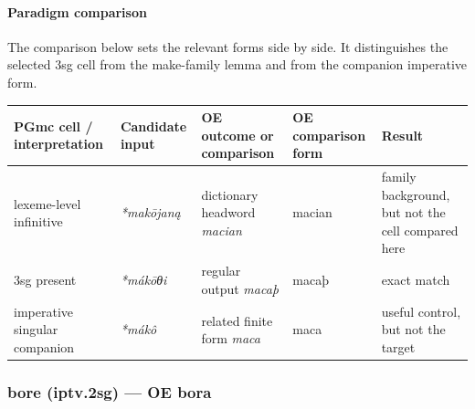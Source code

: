 \documentclass[
  british,
  a4paper,
]{article}
\newcounter{none} %
\begin{document}
\paragraph{Paradigm comparison}\label{paradigm-comparison-19}

The comparison below sets the relevant forms side by side. It
distinguishes the selected 3sg cell from the make-family lemma and from
the companion imperative form.

{\def\LTcaptype{none} %
\begin{longtable}[]{@{}
  >{\raggedright\arraybackslash}p{}
  >{\raggedright\arraybackslash}p{}
  >{\raggedright\arraybackslash}p{}
  >{\raggedright\arraybackslash}p{}
  >{\raggedright\arraybackslash}p{}@{}}
\toprule\noalign{}
\begin{minipage}[b]{\linewidth}\raggedright
PGmc cell / interpretation
\end{minipage} & \begin{minipage}[b]{\linewidth}\raggedright
Candidate input
\end{minipage} & \begin{minipage}[b]{\linewidth}\raggedright
OE outcome or comparison
\end{minipage} & \begin{minipage}[b]{\linewidth}\raggedright
OE comparison form
\end{minipage} & \begin{minipage}[b]{\linewidth}\raggedright
Result
\end{minipage} \\
\midrule\noalign{}
\endhead
\bottomrule\noalign{}
\endlastfoot
lexeme-level infinitive & \emph{*makōjaną} & dictionary headword
\emph{macian} & macian & family background, but not the cell compared
here \\
3sg present & \emph{*mákōθi} & regular output \emph{macaþ} & macaþ &
exact match \\
imperative singular companion & \emph{*mákô} & related finite form
\emph{maca} & maca & useful control, but not the target \\
\end{longtable}
}

\subsubsection{bore (iptv.2sg) --- OE bora}\label{bore-iptv.2sg-oe-bora}
\end{document}

